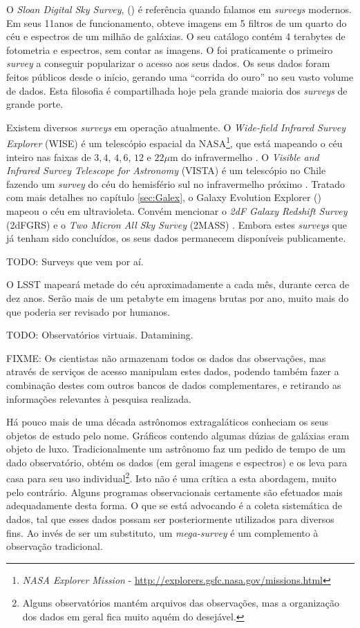 O {\em Sloan Digital Sky Survey}, (\SDSS) \citep{York2000} é referência quando
falamos em {\em surveys} modernos. Em seus 11\fixme anos de funcionamento,
obteve imagens em 5 filtros de um quarto do céu e espectros de um milhão de
galáxias. O seu catálogo contém 4 terabytes de fotometria e espectros, sem
contar as imagens. O \SDSS foi praticamente o primeiro {\em survey} a conseguir
popularizar o acesso aos seus dados. Os seus dados foram feitos públicos desde o
início\citneed, gerando uma ``corrida do ouro'' no seu vasto volume de dados.
Esta filosofia é compartilhada hoje pela grande maioria dos {\em surveys} de
grande porte.

Existem diversos {\em surveys} em operação atualmente. O {\em Wide-field
Infrared Survey Explorer} (WISE) é um telescópio espacial da NASA\footnote{{\em
NASA Explorer Mission} - \url{http://explorers.gsfc.nasa.gov/missions.html}},
que está mapeando o céu inteiro nas faixas de $3,4$, $4,6$, $12$ e $22\mu$m do
infravermelho \citep{Wright2010}. O {\em Visible and Infrared Survey Telescope
for Astronomy} (VISTA) é um telescópio no Chile fazendo um {\em survey} do céu
do hemisfério sul no infravermelho próximo \citep{Born2010}. Tratado com mais
detalhes no capítulo \ref{sec:Galex}, o {Galaxy Evolution Explorer} (\galex)
mapeou o céu em ultravioleta. Convém mencionar o {\em 2dF Galaxy Redshift
Survey} (2dFGRS) \citep{Colless1999} e o {\em Two Micron All Sky Survey} (2MASS)
\citep{Skrutskie2006}. Embora estes {\em surveys} que já tenham sido
concluídos, os seus dados permanecem disponíveis publicamente.

TODO: Surveys que vem por aí.

O LSST mapeará metade do céu aproximadamente a cada mês, durante cerca de dez
anos. Serão mais de um petabyte em imagens brutas por ano, muito mais do que
poderia ser revisado por humanos.

TODO: Observatórios virtuais. Datamining.

FIXME: Os cientistas não armazenam todos os dados das observações, mas através
de serviços de acesso manipulam estes dados, podendo também fazer a combinação
destes com outros bancos de dados complementares, e retirando as informações
relevantes à pesquisa realizada.

Há pouco mais de uma década astrônomos extragaláticos conheciam os seus objetos
de estudo pelo nome. Gráficos contendo algumas dúzias de galáxias eram objeto de
luxo. Tradicionalmente um astrônomo faz um pedido de tempo de um dado
observatório, obtém os dados (em geral imagens e espectros) e os leva para casa
para seu uso individual\footnote{Alguns observatórios mantém arquivos das
observações\citneed, mas a organização dos dados em geral fica muito aquém do
desejável.}. Isto não é uma crítica a esta abordagem, muito pelo contrário.
Alguns programas observacionais certamente são efetuados mais adequadamente
desta forma. O que se está advocando é a coleta sistemática de dados, tal que
esses dados possam ser posteriormente utilizados para diversos fins. Ao invés de
ser um substituto, um {\em mega-survey} é um complemento à observação
tradicional.


